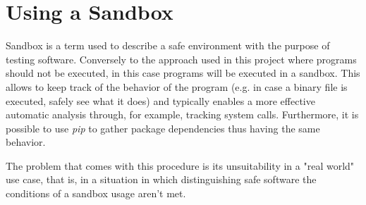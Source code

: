 \section{Using a Sandbox}
Sandbox is a term used to describe a safe environment with the purpose of testing software. Conversely to the approach used in this project where programs should not be executed, in this case programs will be executed in a sandbox. This allows to keep track of the behavior of the program (e.g. in case a binary file is executed, safely see what it does) and typically enables a more effective automatic analysis through, for example, tracking system calls. Furthermore, it is possible to use \textit{pip} to gather package dependencies thus having the same behavior.

The problem that comes with this procedure is its unsuitability in a "real world" use case, that is, in a situation in which distinguishing safe software the conditions of a sandbox usage aren't met. 